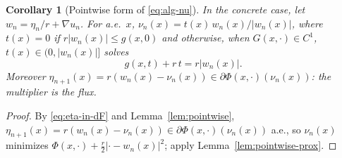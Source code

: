 \documentclass[11pt]{amsart}
\newtheorem{corollary}[theorem]{Corollary}
\theoremstyle{definition}
\theoremstyle{remark}
\numberwithin{equation}{section}
\newcommand{\abs}[1]{\lvert #1\rvert}
\begin{document}
\begin{corollary}[Pointwise form of \eqref{eq:alg-nu}]\label{cor:pointwise-nu}
In the concrete case, let $w_n=\eta_n/r+\nabla u_n$. For a.e.\ $x$, $\nu_n(x)=t(x)\,w_n(x)/\abs{w_n(x)}$, where $t(x)=0$ if $r\abs{w_n(x)}\le g(x,0)$ and otherwise, when $G(x,\cdot)\in C^1$, $t(x)\in(0,\abs{w_n(x)}]$ solves
\begin{equation}\label{eq:scalar}
g(x,t)+r\,t=r\abs{w_n(x)} .
\end{equation}
Moreover $\eta_{n+1}(x)=r(w_n(x)-\nu_n(x))\in\partial\Phi(x,\cdot)(\nu_n(x))$: the multiplier is the flux.
\end{corollary}
\begin{proof}
By \eqref{eq:eta-in-dF} and Lemma~\ref{lem:pointwise}, $\eta_{n+1}(x)=r(w_n(x)-\nu_n(x))\in\partial\Phi(x,\cdot)(\nu_n(x))$ a.e., so $\nu_n(x)$ minimizes $\Phi(x,\cdot)+\frac r2\abs{\cdot-w_n(x)}^2$; apply Lemma~\ref{lem:pointwise-prox}.
\end{proof}
\end{document}
